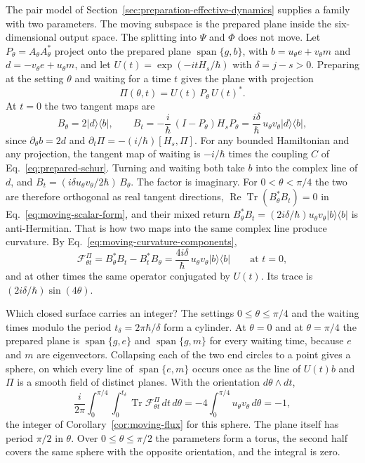 \documentclass[11pt]{article}
\theoremstyle{definition}
\DeclareMathOperator{\Span}{span}
\DeclareMathOperator{\Tr}{Tr}
\newcommand{\ket}[1]{\lvert #1\rangle}
\newcommand{\bra}[1]{\langle #1\rvert}
\begin{document}
The pair model of Section~\ref{sec:preparation-effective-dynamics} supplies a family with two parameters. The moving subspace is the prepared plane inside the six-dimensional output space. The splitting into $\Psi$ and $\Phi$ does not move. Let $P_\theta=A_\theta A_\theta^*$ project onto the prepared plane $\Span\{g,b\}$, with $b=u_\theta e+v_\theta m$ and $d=-v_\theta e+u_\theta m$, and let $U(t)=\exp(-itH_s/\hbar)$ with $\delta=j-s>0$. Preparing at the setting $\theta$ and waiting for a time $t$ gives the plane with projection
\begin{equation}
 \Pi(\theta,t)=U(t)\,P_\theta\,U(t)^* .
 \label{eq:moving-pair-family}
\end{equation}
At $t=0$ the two tangent maps are
\begin{equation}
 B_\theta=2\ket{d}\bra{b},\qquad
 B_t=-\frac{i}{\hbar}\,(I-P_\theta)H_sP_\theta=\frac{i\delta}{\hbar}\,u_\theta v_\theta\ket{d}\bra{b},
 \label{eq:moving-pair-tangents}
\end{equation}
since $\partial_\theta b=2d$ and $\partial_t\Pi=-(i/\hbar)[H_s,\Pi]$. For any bounded Hamiltonian and any projection, the tangent map of waiting is $-i/\hbar$ times the coupling $C$ of Eq.~\eqref{eq:prepared-schur}. Turning and waiting both take $b$ into the complex line of $d$, and $B_t=(i\delta u_\theta v_\theta/2\hbar)\,B_\theta$. The factor is imaginary. For $0<\theta<\pi/4$ the two are therefore orthogonal as real tangent directions, $\operatorname{Re}\Tr(B_\theta^*B_t)=0$ in Eq.~\eqref{eq:moving-scalar-form}, and their mixed return $B_\theta^*B_t=(2i\delta/\hbar)u_\theta v_\theta\ket{b}\bra{b}$ is anti-Hermitian. That is how two maps into the same complex line produce curvature. By Eq.~\eqref{eq:moving-curvature-components},
\begin{equation}
 \mathcal F^\Pi_{\theta t}=B_\theta^*B_t-B_t^*B_\theta=\frac{4i\delta}{\hbar}\,u_\theta v_\theta\ket{b}\bra{b}
 \qquad\text{at }t=0 ,
 \label{eq:moving-pair-curvature}
\end{equation}
and at other times the same operator conjugated by $U(t)$. Its trace is $(2i\delta/\hbar)\sin(4\theta)$.

Which closed surface carries an integer? The settings $0\le\theta\le\pi/4$ and the waiting times modulo the period $t_\delta=2\pi\hbar/\delta$ form a cylinder. At $\theta=0$ and at $\theta=\pi/4$ the prepared plane is $\Span\{g,e\}$ and $\Span\{g,m\}$ for every waiting time, because $e$ and $m$ are eigenvectors. Collapsing each of the two end circles to a point gives a sphere, on which every line of $\Span\{e,m\}$ occurs once as the line of $U(t)b$ and $\Pi$ is a smooth field of distinct planes. With the orientation $d\theta\wedge dt$,
\begin{equation}
 \frac{i}{2\pi}\int_0^{\pi/4}\!\!\int_0^{t_\delta}\Tr\mathcal F^\Pi_{\theta t}\,dt\,d\theta
   =-4\int_0^{\pi/4}u_\theta v_\theta\,d\theta=-1 ,
 \label{eq:moving-pair-flux}
\end{equation}
the integer of Corollary~\ref{cor:moving-flux} for this sphere. The plane itself has period $\pi/2$ in $\theta$. Over $0\le\theta\le\pi/2$ the parameters form a torus, the second half covers the same sphere with the opposite orientation, and the integral is zero.
\end{document}

